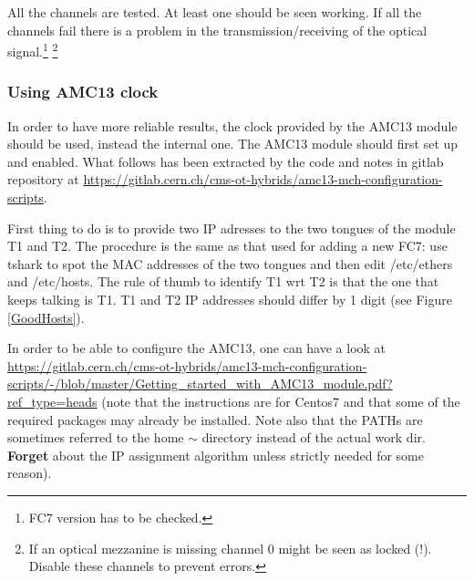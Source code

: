 \documentclass[10pt,a4paper]{article}
\begin{document}
 All the channels are tested. At least one should be seen working.
If all the channels fail there is a problem in the transmission/receiving of the optical signal.\footnote[1]{FC7 version has to be checked.}
\footnote[2]{If an optical mezzanine is missing channel 0 might be seen as locked (!). Disable these channels to prevent errors.}


\subsubsection{Using AMC13 clock}
In order to have more reliable results, the clock provided by the AMC13 module should be used, instead the internal one.
The AMC13 module should first set up and enabled. What follows has been extracted by the code and notes in gitlab repository at \url{https://gitlab.cern.ch/cms-ot-hybrids/amc13-mch-configuration-scripts}.

First thing to do is to provide two IP adresses to the two tongues of the module T1 and T2. The procedure is the same as that used for adding a new FC7: use tshark to spot the MAC addresses of the two tongues and then edit /etc/ethers and /etc/hosts. The rule of thumb to identify T1 wrt T2 is that the one that keeps talking is T1. T1 and T2 IP addresses should differ by 1 digit (see Figure \ref{GoodHosts}).

In order to be able to configure the AMC13, one can have a look at \url{https://gitlab.cern.ch/cms-ot-hybrids/amc13-mch-configuration-scripts/-/blob/master/Getting_started_with_AMC13_module.pdf?ref_type=heads} (note that the instructions are for Centos7 and that some of the required packages may already be installed. Note also that the PATHs are sometimes referred to the home $\sim$ directory instead of the actual work dir. {\bf Forget} about the IP assignment algorithm unless strictly needed for some reason). 
\end{document}
